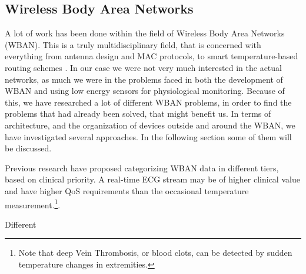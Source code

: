 


\subsection{Wireless Body Area Networks} %
\label{sub:wireless_body_area_networks}





A lot of work has been done within the field of Wireless Body Area Networks (WBAN). This is a truly multidisciplinary field, that is concerned with everything from antenna design and MAC protocols, to smart temperature-based routing schemes \cite{Movassaghi:2014hi}. In our case we were not very much interested in the actual networks, as much we were in the problems faced in both the development of WBAN and using low energy sensors for physiological monitoring. Because of this, we have researched a lot of different WBAN problems, in order to find the problems that had already been solved, that might benefit us. In terms of architecture, and the organization of devices outside and around the WBAN, we have investigated several approaches. In the following section some of them will be discussed.

Previous research have proposed categorizing WBAN data in different tiers, based on clinical priority. A real-time ECG stream may be of higher clinical value and have higher QoS requirements than the occasional temperature measurement.\footnote{ Note that deep Vein Thrombosis, or blood clots, can be detected by sudden temperature changes in extremities.}.

Different 

